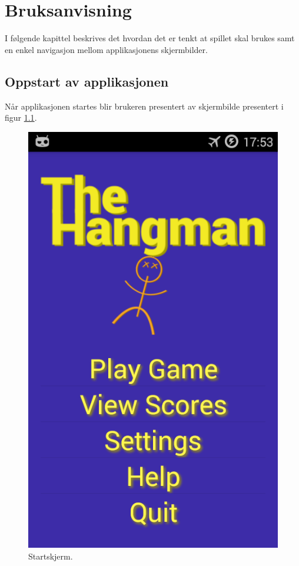 \chapter{Bruksanvisning}
I følgende kapittel beskrives det hvordan det er tenkt at spillet skal brukes samt en enkel navigasjon mellom applikasjonens skjermbilder. 

\section{Oppstart av applikasjonen}
Når applikasjonen startes blir brukeren presentert av skjermbilde presentert i figur \ref{fig:activity_front}. 
\begin{figure}[ht]
\centering
 \includegraphics[scale=0.25]{./img/bruksanvisning/1.png}
 \caption{Startskjerm.}
 \label{fig:activity_front}
\end{figure}

